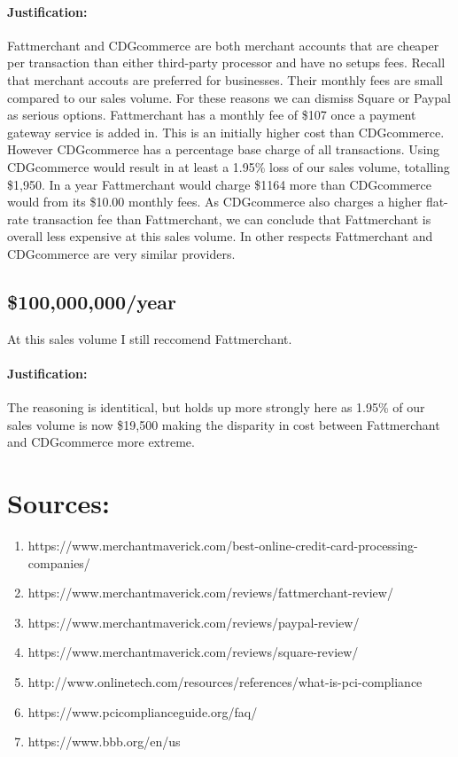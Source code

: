 \documentclass[letterpaper]{article}
\begin{document}
      \paragraph{Justification:}
        Fattmerchant and CDGcommerce are both merchant accounts that are cheaper per transaction than
        either third-party processor and have no setups fees. Recall that merchant accouts are preferred for businesses. Their monthly fees are small compared to our sales volume. For these reasons
        we can dismiss Square or Paypal as serious options.
        Fattmerchant has a monthly fee of \$107 once a payment gateway service is added in.
        This is an initially higher cost than CDGcommerce. However CDGcommerce has a percentage base charge of all transactions.
        Using CDGcommerce would result in at least a 1.95\% loss of our sales volume, totalling \$1,950. In a year Fattmerchant would charge
        \$1164 more than CDGcommerce would from its \$10.00 monthly fees. As CDGcommerce also charges a higher flat-rate transaction fee than Fattmerchant,
        we can conclude that Fattmerchant is overall less expensive at this sales volume.
        In other respects Fattmerchant and CDGcommerce are very similar providers.
    \subsection{\$100,000,000/year}
      At this sales volume I still reccomend Fattmerchant.
      \paragraph{Justification:}
        The reasoning is identitical, but holds up more strongly here as 1.95\% of our sales volume is now \$19,500 making the disparity
        in cost between Fattmerchant and CDGcommerce more extreme.
  \section{Sources:}
    \begin{enumerate}
      \item https://www.merchantmaverick.com/best-online-credit-card-processing-companies/
      \item https://www.merchantmaverick.com/reviews/fattmerchant-review/
      \item https://www.merchantmaverick.com/reviews/paypal-review/
      \item https://www.merchantmaverick.com/reviews/square-review/
      \item http://www.onlinetech.com/resources/references/what-is-pci-compliance
      \item https://www.pcicomplianceguide.org/faq/
      \item https://www.bbb.org/en/us
    \end{enumerate}
\end{document}
